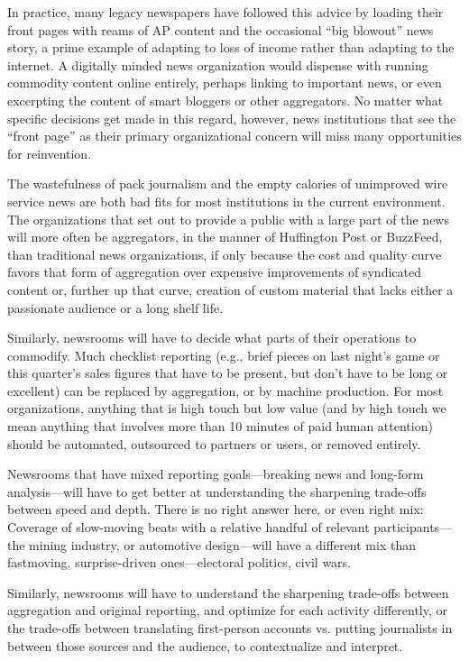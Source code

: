 In practice, many legacy newspapers have followed this advice by loading their
front pages with reams of AP content and the occasional ``big blowout'' news
story, a prime example of adapting to loss of income rather than adapting to the
internet. A digitally minded news organization would dispense with running
commodity content online entirely, perhaps linking to important news, or even
excerpting the content of smart bloggers or other aggregators. No matter what
specific decisions get made in this regard, however, news institutions that see the
``front page'' as their primary organizational concern will miss many opportunities
for reinvention.

The wastefulness of pack journalism and the empty calories of unimproved wire
service news are both bad fits for most institutions in the current environment.
The organizations that set out to provide a public with a large part of the news
will more often be aggregators, in the manner of Huffington Post or BuzzFeed,
than traditional news organizations, if only because the cost and quality curve favors that form of aggregation over expensive improvements of syndicated content
or, further up that curve, creation of custom material that lacks either a passionate
audience or a long shelf life.

Similarly, newsrooms will have to decide what parts of their operations to commodify.
Much checklist reporting (e.g., brief pieces on last night’s game or this
quarter’s sales figures that have to be present, but don’t have to be long or excellent)
can be replaced by aggregation, or by machine production. For most organizations,
anything that is high touch but low value (and by high touch we mean
anything that involves more than 10 minutes of paid human attention) should be
automated, outsourced to partners or users, or removed entirely.

Newsrooms that have mixed reporting goals—breaking news and long-form
analysis—will have to get better at understanding the sharpening trade-offs
between speed and depth. There is no right answer here, or even right mix:
Coverage of slow-moving beats with a relative handful of relevant participants—
the mining industry, or automotive design—will have a different mix than fastmoving,
surprise-driven ones—electoral politics, civil wars.

Similarly, newsrooms will have to understand the sharpening trade-offs between
aggregation and original reporting, and optimize for each activity differently, or
the trade-offs between translating first-person accounts vs. putting journalists in
between those sources and the audience, to contextualize and interpret.

